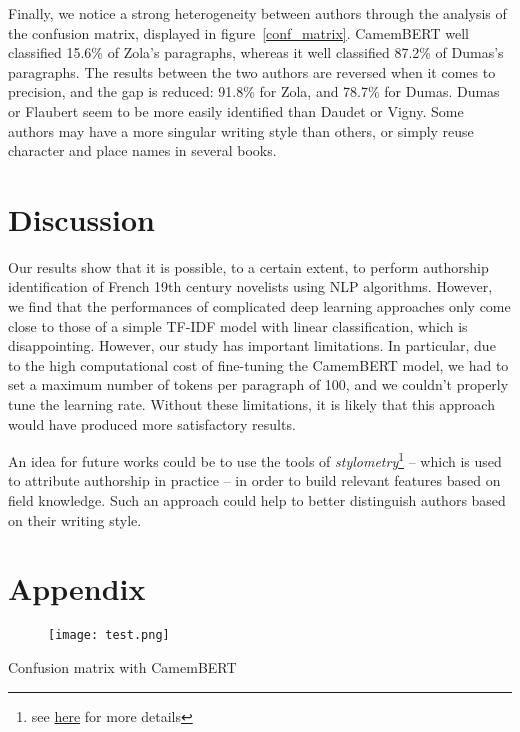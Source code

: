 \documentclass[11pt,a4paper]{article}
\begin{document}
Finally, we notice a strong heterogeneity between authors through the analysis of the confusion matrix, displayed in figure~\ref{conf_matrix}. CamemBERT well classified 15.6\% of Zola's paragraphs, whereas it well classified 87.2\% of Dumas's paragraphs. The results between the two authors are reversed when it comes to precision, and the gap is reduced: 91.8\% for Zola, and 78.7\% for Dumas. Dumas or Flaubert seem to be more easily identified than Daudet or Vigny. Some authors may have a more singular writing style than others, or simply reuse character and place names in several books.


\section{Discussion}

Our results show that it is possible, to a certain extent, to perform authorship identification of French 19th century novelists using NLP algorithms. However, we find that the performances of complicated deep learning approaches only come close  to those of a simple TF-IDF model with linear classification, which is disappointing. However, our study has important limitations. In particular, due to the high computational cost of fine-tuning the CamemBERT model, we had to set a maximum number of tokens per paragraph of 100, and we couldn't properly tune the learning rate. Without these limitations, it is likely that this approach would have produced more satisfactory results.

An idea for future works could be to use the tools of \textit{stylometry}\footnote{see \href{https://en.wikipedia.org/wiki/Stylometry}{here} for more details} -- which is used to attribute authorship in practice -- in order to build relevant features based on field knowledge. Such an approach could help to better distinguish authors based on their writing style.







\newpage





\section*{Appendix}

\begin{figure*}[]
\texttt{[image: test.png]}
\end{figure*}


\begin{table}[h]
\caption{Confusion matrix with CamemBERT}
\label{conf_matrix}
\begin{center}

\end{center}
\end{table}
\end{document}
